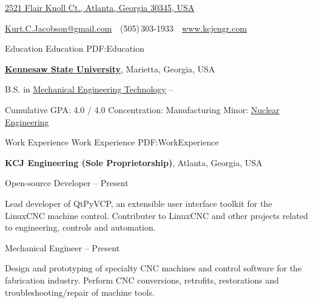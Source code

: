 \documentclass[
letterpaper,
MMMyyyy,
nonstopmode,
draftmode,
]{resume}
\makeatletter
\newcommand{\CVAuthor}{Kurt C. Jacobson}
\newcommand{\CVWebpage}{www.kcjengr.com}
\newcommand{\CVEmail}{Kurt.C.Jacobson@gmail.com}
\makeatother
\begin{document}

\Title{\CVAuthor}

\begin{SubTitle}
\href{https://www.google.com/maps/place/2521+Flair+Knoll+Ct+NE,+Atlanta,+GA+30345}
{2521 Flair Knoll Ct., Atlanta, Georgia 30345, USA}
\par
\href{mailto:\CVEmail}
{\CVEmail}
\,\SubBulletSymbol\,
(505)\,303-1933
\,\SubBulletSymbol\,
\href{\CVWebpage}
{\url{\CVWebpage}}
\end{SubTitle}

\begin{Body}


\Section
{Education}
{Education}
{PDF:Education}

\Entry
\href{http://www.kennesaw.edu/}
{\textbf{Kennesaw State University}},
Marietta, Georgia, USA

\Gap
\BulletItem
B.S. in
\href{http://engineering.kennesaw.edu/engineering-technology/}
{Mechanical Engineering Technology}
\hfill
{} --
\begin{Detail}
\SubBulletItem
Cumulative GPA: 4.0 / 4.0
\SubBulletItem
Concentration: Manufacturing
\SubBulletItem
Minor:
\href{http://engineering.kennesaw.edu/nuclear-studies/}
{Nuclear Engineering}
\end{Detail}



\Section
{Work Experience}
{Work Experience}
{PDF:WorkExperience}

\Entry
\textbf{KCJ Engineering (Sole Proprietorship)},
Atlanta, Georgia, USA

\Gap
\BulletItem
Open-source Developer
\hfill
{} --
Present
\begin{Detail}
\SubBulletItem
Lead developer of QtPyVCP, an extensible user interface toolkit for the LinuxCNC machine control.
\SubBulletItem
Contributer to LinuxCNC and other projects related to engineering, controls and automation.
\end{Detail}

\Gap
\BulletItem
Mechanical Engineer
\hfill
{} --
Present
\begin{Detail}
\SubBulletItem
Design and prototyping of specialty CNC machines and control software for the fabrication industry.
\SubBulletItem
Perform CNC conversions, retrofits, restorations and troubleshooting/repair of machine tools.
\end{Detail}


\end{Body}
\end{document}
